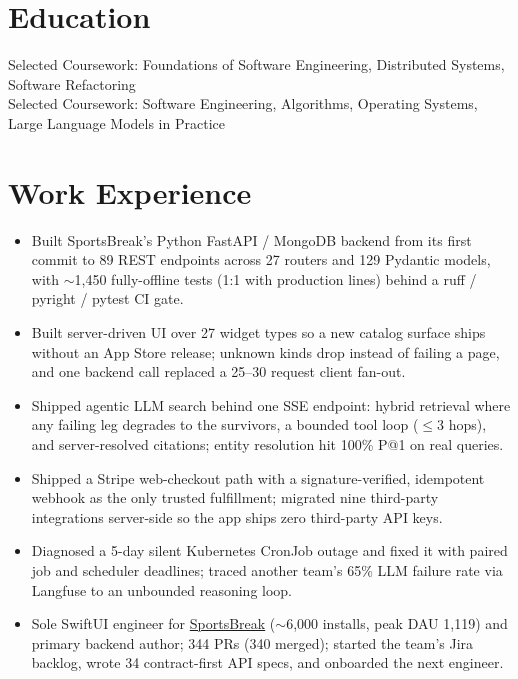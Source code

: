 \documentclass[11pt, letterpaper]{article}
\begin{document}

\section{Education}
Selected Coursework: Foundations of Software Engineering, Distributed Systems, Software Refactoring\\[1pt]
Selected Coursework: Software Engineering, Algorithms, Operating Systems, Large Language Models in Practice

\section{Work Experience}
\begin{itemize}
  \item Built SportsBreak's Python FastAPI / MongoDB backend from its first commit to 89 REST endpoints across 27 routers and 129 Pydantic models, with $\sim$1{,}450 fully-offline tests (1:1 with production lines) behind a ruff / pyright / pytest CI gate.
  \item Built server-driven UI over 27 widget types so a new catalog surface ships without an App Store release; unknown kinds drop instead of failing a page, and one backend call replaced a 25--30 request client fan-out.
  \item Shipped agentic LLM search behind one SSE endpoint: hybrid retrieval where any failing leg degrades to the survivors, a bounded tool loop ($\le$3 hops), and server-resolved citations; entity resolution hit 100\% P@1 on real queries.
  \item Shipped a Stripe web-checkout path with a signature-verified, idempotent webhook as the only trusted fulfillment; migrated nine third-party integrations server-side so the app ships zero third-party API keys.
  \item Diagnosed a 5-day silent Kubernetes CronJob outage and fixed it with paired job and scheduler deadlines; traced another team's 65\% LLM failure rate via Langfuse to an unbounded reasoning loop.
  \item Sole SwiftUI engineer for \href{https://apps.apple.com/app/id6762649287}{SportsBreak} ($\sim$6{,}000 installs, peak DAU 1{,}119) and primary backend author; 344 PRs (340 merged); started the team's Jira backlog, wrote 34 contract-first API specs, and onboarded the next engineer.
\end{itemize}
\end{document}
